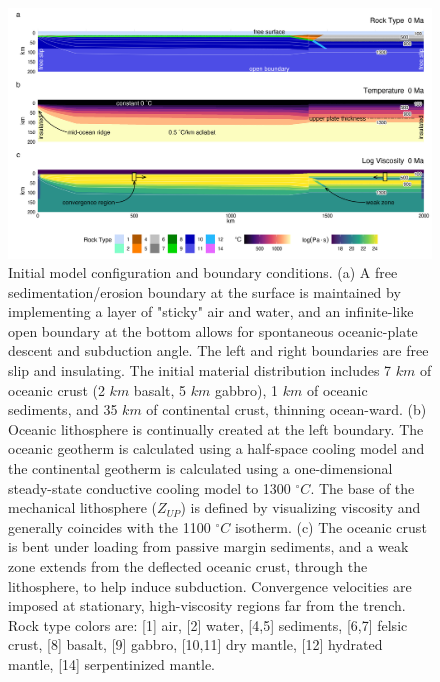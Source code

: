 \begin{landscape}

\begin{figure}[htbp]

{\centering \includegraphics[width=1\linewidth,]{assets/figs/chpt2/fig1} 

}

\caption[Initial model configuration and boundary conditions]{Initial model configuration and boundary conditions. (a) A free sedimentation/erosion boundary at the surface is maintained by implementing a layer of "sticky" air and water, and an infinite-like open boundary at the bottom allows for spontaneous oceanic-plate descent and subduction angle. The left and right boundaries are free slip and insulating. The initial material distribution includes 7 $km$ of oceanic crust (2 $km$ basalt, 5 $km$ gabbro), 1 $km$ of oceanic sediments, and 35 $km$ of continental crust, thinning ocean-ward. (b) Oceanic lithosphere is continually created at the left boundary. The oceanic geotherm is calculated using a half-space cooling model and the continental geotherm is calculated using a one-dimensional steady-state conductive cooling model to 1300 $^{\circ}C$. The base of the mechanical lithosphere ($Z_{UP}$) is defined by visualizing viscosity and generally coincides with the 1100 $^{\circ}C$ isotherm. (c) The oceanic crust is bent under loading from passive margin sediments, and a weak zone extends from the deflected oceanic crust, through the lithosphere, to help induce subduction. Convergence velocities are imposed at stationary, high-viscosity regions far from the trench. Rock type colors are: [1] air, [2] water, [4,5] sediments, [6,7] felsic crust, [8] basalt, [9] gabbro, [10,11] dry mantle, [12] hydrated mantle, [14] serpentinized mantle.}\label{fig:init}
\end{figure}


\end{landscape}
